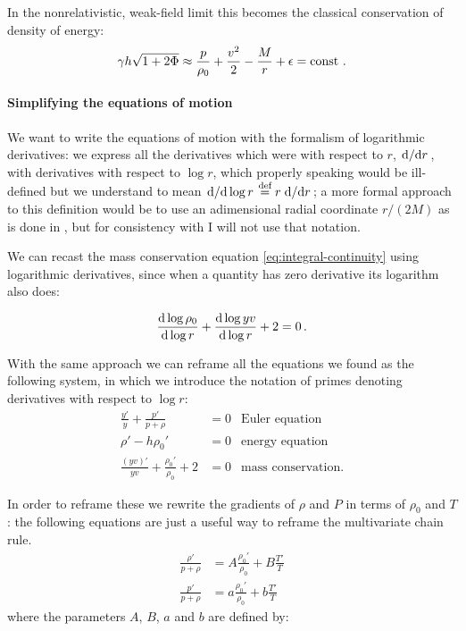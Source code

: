 \documentclass[main.tex]{subfiles}
\begin{document}
In the nonrelativistic, weak-field limit this becomes the classical conservation of density of energy:
%
\begin{equation}
    \gamma h \sqrt{1+2\Phi} \approx \frac{p}{\rho_0} + \frac{v^2}{2} - \frac{M}{r} + \epsilon = \const \,.
\end{equation}

\paragraph{Simplifying the equations of motion} \label{par:adiabatic-equations-of-motion}

We want to write the equations of motion with the formalism of logarithmic derivatives: we express all the derivatives which were with respect to \(r\),  \(\dv*{}{r} \), with derivatives with respect to \(\log r \), which properly speaking would be ill-defined but we understand to mean \(\dv*{}{\log r} \stackrel{\text{def}}{=} r \dv*{}{r} \); a more formal approach to this definition would be to use an adimensional radial coordinate \(r/(2M)\) as is done in \cite[]{NobiliTurollaZampieri:1991dec}, but for consistency with \cite[]{Nobili:2000} I will not use that notation.

We can recast the mass conservation equation \eqref{eq:integral-continuity} using logarithmic derivatives, since when a quantity has zero derivative its logarithm also does:

\begin{equation} \label{eq:differential-continuity}
  \dv{\log \rho_0}{\log r} +
  \dv{\log yv}{\log r} + 2 = 0 \,.
\end{equation}

With the same approach we can reframe all the equations we found as the following system, in which we introduce the notation of primes denoting derivatives with respect to \(\log r\):
%
\begin{subequations}
\begin{align}
  \frac{y'}{y} + \frac{p'}{p + \rho}  &= 0 & \text{Euler equation} \label{eq:accretion-euler}  \\
  \rho' - h \rho_0' &= 0  & \text{energy equation}  \label{eq:accretion-energy}\\
  \frac{(yv)'}{yv} + \frac{\rho_0'}{\rho_0} + 2 &=0 & \text{mass conservation.}  \label{eq:accretion-mass}
\end{align}
\end{subequations}

In order to reframe these we rewrite the gradients of \(\rho\) and \(P\) in terms of \(\rho_0\) and \(T\): the following equations are just a useful way to reframe the multivariate chain rule.
%
\begin{subequations}
\begin{align}
  \frac{\rho'}{p+ \rho}  &= A \frac{\rho_0'}{\rho_0}
      + B \frac{T'}{T} \\
  \frac{p'}{p+ \rho}  &= a \frac{\rho_0'}{\rho_0}
      + b \frac{T'}{T}
\end{align}
\end{subequations}
%
where the parameters \(A\), \(B\), \(a\) and \(b\) are defined by:
\end{document}
